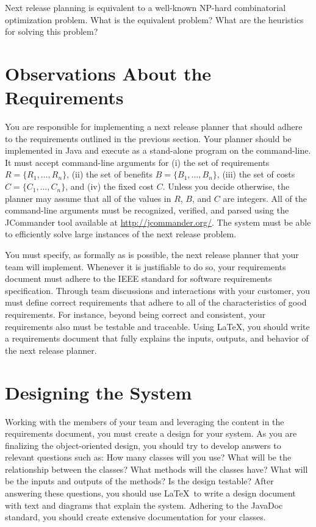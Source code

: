 Next release planning is equivalent to a well-known NP-hard combinatorial optimization problem.  What is the
equivalent problem? What are the heuristics for solving this problem?

\section*{Observations About the Requirements}

You are responsible for implementing a next release planner that should adhere to the requirements outlined in the
previous section.  Your planner should be implemented in Java and execute as a stand-alone program on the command-line.
It must accept command-line arguments for (i) the set of requirements $R = \{ R_1, \ldots, R_n \}$, (ii) the set of
benefits $B = \{ B_1, \ldots, B_n \}$, (iii) the set of costs $C = \{ C_1, \ldots, C_n \}$, and (iv) the
fixed cost $C$. Unless you decide otherwise, the planner may assume that all of the values in $R$, $B$, and $C$ are
integers. All of the command-line arguments must be recognized, verified, and parsed using the JCommander tool available
at \url{http://jcommander.org/}. The system must be able to efficiently solve large instances of the next release problem.

You must specify, as formally as is possible, the next release planner that your team will implement.  Whenever it is
justifiable to do so, your requirements document must adhere to the IEEE standard for software requirements
specification.  Through team discussions and interactions with your customer, you must define correct requirements that
adhere to all of the characteristics of good requirements.  For instance, beyond being correct and consistent, your
requirements also must be testable and traceable.  Using \LaTeX, you should write a requirements document that fully explains
the inputs, outputs, and behavior of the next release planner.

\section*{Designing the System}

Working with the members of your team and leveraging the content in the requirements document, you must create a
design for your system.  As you are finalizing the object-oriented design, you should try to develop answers to relevant
questions such as: How many classes will you use? What will be the relationship between the classes? What methods will
the classes have? What will be the inputs and outputs of the methods?  Is the design testable?  After answering these
questions, you should use \LaTeX\  to write a design document with text and diagrams that explain the system. Adhering
to the JavaDoc standard, you should create extensive documentation for your classes.

